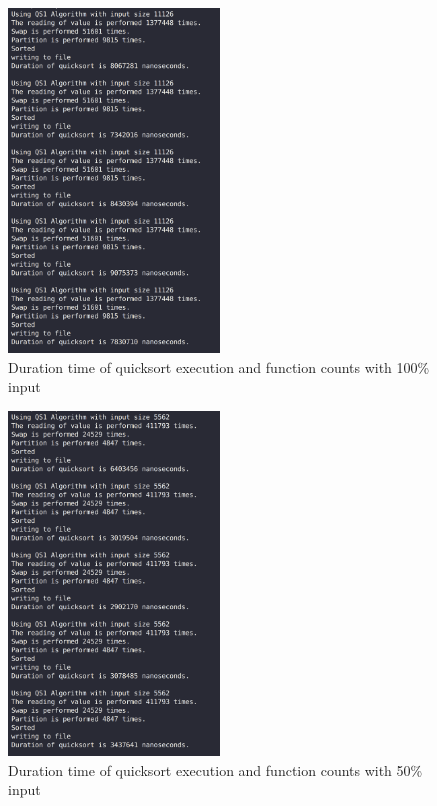 \begin{figure}[H]
\begin{center}
\leavevmode
\includegraphics[width=0.5\textwidth]{qsmax.png}
\caption{Duration time of quicksort execution and function counts with 100\% input }
\label{qs_max}
\end{center}
\end{figure}
\begin{figure}[H]
\begin{center}
\leavevmode
\includegraphics[width=0.5\textwidth]{qshalf.png}
\caption{Duration time of quicksort execution and function counts with 50\% input }
\label{qs_half}
\end{center}
\end{figure}
